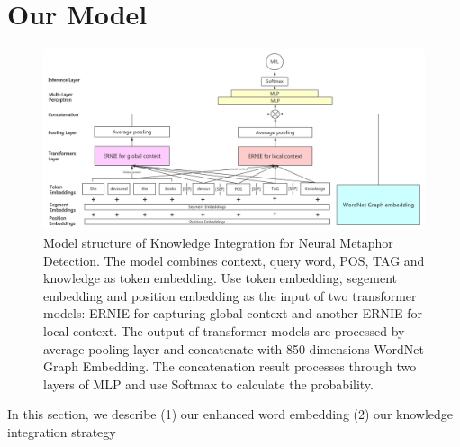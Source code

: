 \documentclass[11pt,a4paper]{article}
\begin{document}
\section{Our Model}

\begin{figure}[htbp]
    \centering
    \includegraphics[scale=0.22]{asset/model.png}
    \caption{Model structure of Knowledge Integration for Neural Metaphor Detection. The model combines context, query word, POS, TAG and knowledge as token embedding. Use token embedding, segement embedding and position embedding as the input of two transformer models: ERNIE for capturing global context and another ERNIE for local context. The output of transformer models are processed by average pooling layer and concatenate with 850 dimensions WordNet Graph Embedding. The concatenation result processes through two layers of MLP and use Softmax to calculate the probability.}
    \label{img1}
\end{figure}

In this section, we describe (1) our enhanced word embedding (2) our knowledge integration strategy

\end{document}
